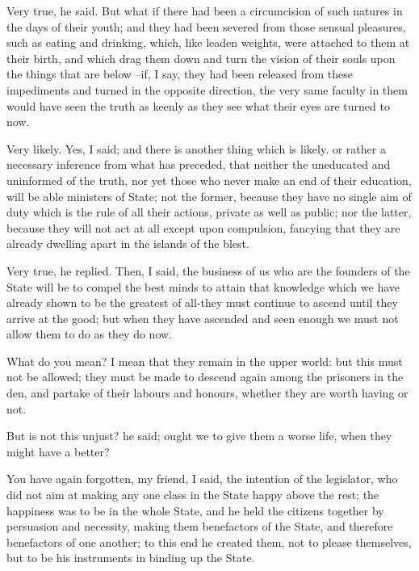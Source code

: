 Very true, he said.
But what if there had been a circumcision of such natures in the days of their youth; and they had been severed from those sensual pleasures, such as eating and drinking, which, like leaden weights, were attached to them at their birth, and which drag them down and turn the vision of their souls upon the things that are below --if, I say, they had been released from these impediments and turned in the opposite direction, the very same faculty in them would have seen the truth as keenly as they see what their eyes are turned to now.

Very likely.
Yes, I said; and there is another thing which is likely. or rather a necessary inference from what has preceded, that neither the uneducated and uninformed of the truth, nor yet those who never make an end of their education, will be able ministers of State; not the former, because they have no single aim of duty which is the rule of all their actions, private as well as public; nor the latter, because they will not act at all except upon compulsion, fancying that they are already dwelling apart in the islands of the blest.

Very true, he replied.
Then, I said, the business of us who are the founders of the State will be to compel the best minds to attain that knowledge which we have already shown to be the greatest of all-they must continue to ascend until they arrive at the good; but when they have ascended and seen enough we must not allow them to do as they do now.

What do you mean?
I mean that they remain in the upper world: but this must not be allowed; they must be made to descend again among the prisoners in the den, and partake of their labours and honours, whether they are worth having or not.

But is not this unjust? he said; ought we to give them a worse life, when they might have a better?

You have again forgotten, my friend, I said, the intention of the legislator, who did not aim at making any one class in the State happy above the rest; the happiness was to be in the whole State, and he held the citizens together by persuasion and necessity, making them benefactors of the State, and therefore benefactors of one another; to this end he created them, not to please themselves, but to be his instruments in binding up the State.

